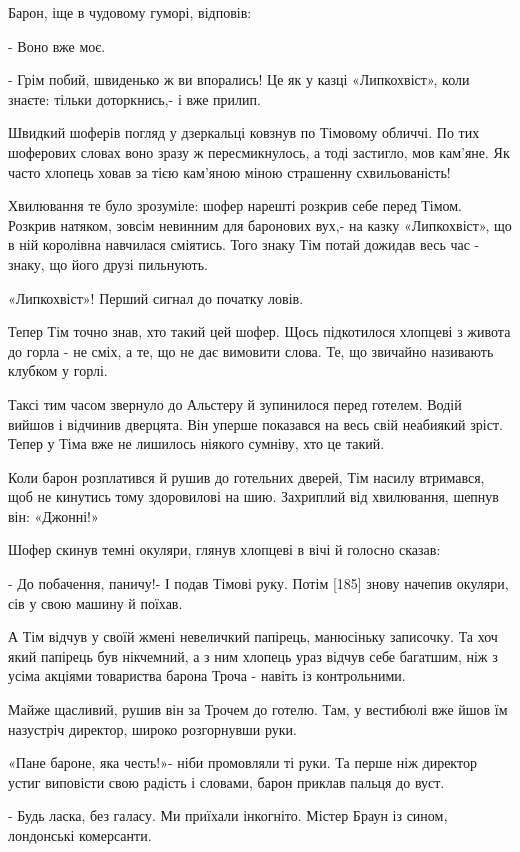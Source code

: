 Барон, іще в чудовому гуморі, відповів:

- Воно вже моє.

- Грім побий, швиденько ж ви впорались! Це як у казці «Липкохвіст», коли знаєте: тільки доторкнись,- і вже прилип.

Швидкий шоферів погляд у дзеркальці ковзнув по Тімовому обличчі. По тих шоферових словах воно зразу ж пересмикнулось, а тоді застигло, мов кам'яне. Як часто хлопець ховав за тією кам'яною міною страшенну схвильованість!

Хвилювання те було зрозуміле: шофер нарешті розкрив себе перед Тімом. Розкрив натяком, зовсім невинним для баронових вух,- на казку «Липкохвіст», що в ній королівна навчилася сміятись. Того знаку Тім потай дожидав весь час - знаку, що його друзі пильнують.

«Липкохвіст»! Перший сигнал до початку ловів.

Тепер Тім точно знав, хто такий цей шофер. Щось підкотилося хлопцеві з живота до горла - не сміх, а те, що не дає вимовити слова. Те, що звичайно називають клубком у горлі.

Таксі тим часом звернуло до Альстеру й зупинилося перед готелем. Водій вийшов і відчинив дверцята. Він уперше показався на весь свій неабиякий зріст. Тепер у Тіма вже не лишилось ніякого сумніву, хто це такий.

Коли барон розплатився й рушив до готельних дверей, Тім насилу втримався, щоб не кинутись тому здоровилові на шию. Захриплий від хвилювання, шепнув він: «Джонні!»

Шофер скинув темні окуляри, глянув хлопцеві в вічі й голосно сказав:

- До побачення, паничу!- І подав Тімові руку. Потім [185] знову начепив окуляри, сів у свою машину й поїхав.

А Тім відчув у своїй жмені невеличкий папірець, манюсіньку записочку. Та хоч який папірець був нікчемний, а з ним хлопець ураз відчув себе багатшим, ніж з усіма акціями товариства барона Троча - навіть із контрольними.

Майже щасливий, рушив він за Трочем до готелю. Там, у вестибюлі вже йшов їм назустріч директор, широко розгорнувши руки.

«Пане бароне, яка честь!»- ніби промовляли ті руки. Та перше ніж директор устиг виповісти свою радість і словами, барон приклав пальця до вуст.

- Будь ласка, без галасу. Ми приїхали інкогніто. Містер Браун із сином, лондонські комерсанти.

